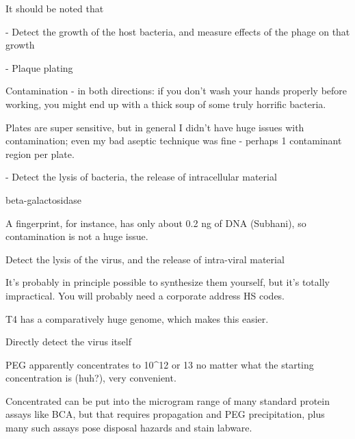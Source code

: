 \documentclass[paper.tex]{subfiles}
\begin{document}
It should be noted that 

- Detect the growth of the host bacteria, and measure effects of the phage on that growth

- Plaque plating


Contamination - in both directions: if you don’t wash your hands properly before working, you might end up with a thick soup of some truly horrific bacteria.

Plates are super sensitive, but in general I didn’t have huge issues with contamination; even my bad aseptic technique was fine - perhaps 1 contaminant region per plate.


- Detect the lysis of bacteria, the release of intracellular material


beta-galactosidase


A fingerprint, for instance, has only about 0.2 ng of DNA (Subhani), so contamination is not a huge issue.

Detect the lysis of the virus, and the release of intra-viral material



 It’s probably in principle possible to synthesize them yourself, but it’s totally impractical. You will probably need a corporate address HS codes. 

T4 has a comparatively huge genome, which makes this easier.

Directly detect the virus itself




PEG apparently concentrates to 10^12 or 13 no matter what the starting concentration is (huh?), very convenient.

Concentrated can be put into the microgram range of many standard protein assays like BCA, but that requires propagation and PEG precipitation, plus many such assays pose disposal hazards and stain labware. 
\end{document}
